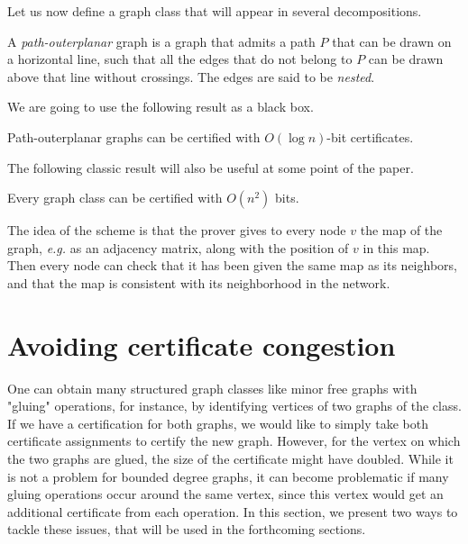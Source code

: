 \documentclass[a4paper,thm-restate,USenglish]{lipics-v2019}
\begin{document}
Let us now define a graph class that will appear in several decompositions.

\begin{definition}
A \emph{path-outerplanar} graph is a graph that admits a  path $P$ that can be drawn on a horizontal line, such that all the edges that do not belong to $P$ can be drawn above that line without crossings. The edges are said to be \emph{nested}.
\end{definition}

We are going to use the following result as a black box.

\begin{lemma}\label{lem:path-outerplanar}
Path-outerplanar graphs can be certified with $O(\log n)$-bit certificates.
\end{lemma}

The following classic result will also be useful at some point of the paper.  

\begin{lemma}
\label{lem:universal}
Every graph class can be certified with $O(n^2)$ bits.
\end{lemma}

The idea of the scheme is that the prover gives to every node $v$ the map of the graph, \emph{e.g.} as an adjacency matrix, along with the position of $v$ in this map. Then every node can check that it has been given the same map as its neighbors, and that the map is consistent with its neighborhood in the network.

\section{Avoiding certificate congestion}
\label{sec:avoiding-congestion}

One can obtain many structured graph classes like minor free graphs with "gluing" operations, for instance, by identifying vertices of two graphs of the class. If we have a certification for both graphs, we would like to simply take both certificate assignments to certify the new graph. However, for the vertex on which the two graphs are glued, the size of the certificate might have doubled. While it is not a problem for bounded degree graphs, it can become problematic if many gluing operations occur around the same vertex, since this vertex would get an additional certificate from each operation. In this section, we present two ways to tackle these issues, that will be used in the forthcoming sections. 
\end{document}
